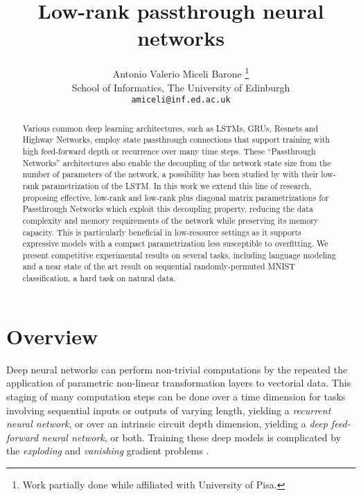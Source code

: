 \documentclass[11pt,a4paper]{article}
\title{Low-rank passthrough neural networks}
\author{Antonio Valerio Miceli Barone  \thanks{Work partially done while affiliated with University of Pisa.} \\
School of Informatics, The University of Edinburgh \\
\tt{amiceli@inf.ed.ac.uk} \\
}
\date{}
\begin{document}
\maketitle

\begin{abstract}
Various common deep learning architectures, such as LSTMs, GRUs, Resnets and Highway Networks, employ state passthrough connections that support training with high feed-forward depth or recurrence over many time steps.
These ``Passthrough Networks'' architectures also enable the decoupling of the network state size from the number of parameters of the network, a possibility has been studied by  with their low-rank parametrization of the LSTM.
In this work we extend this line of research, proposing effective, low-rank and low-rank plus diagonal matrix parametrizations for Passthrough Networks which exploit this decoupling property, reducing the data complexity and memory requirements of the network while preserving its memory capacity. 
This is particularly beneficial in low-resource settings as it supports expressive models with a compact parametrization less susceptible to overfitting.
We present competitive experimental results on several tasks, including language modeling and a near state of the art result on sequential randomly-permuted MNIST classification, a hard task on natural data.
\end{abstract}

\section{Overview}

Deep neural networks can perform non-trivial computations by the repeated the application of parametric non-linear transformation layers to vectorial data. This staging of many computation steps can be done over a time dimension for tasks involving sequential inputs or outputs of varying length, yielding a \textit{recurrent neural network}, or over an intrinsic circuit depth dimension, yielding a \textit{deep feed-forward neural network}, or both. Training these deep models is complicated by the \textit{exploding} and \textit{vanishing} gradient problems \cite{Hochreiter1991, Bengio1994}.
\end{document}
